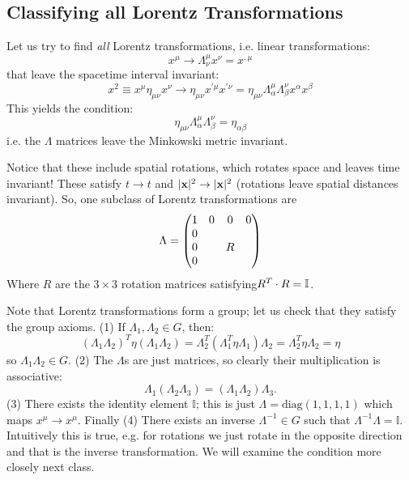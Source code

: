 \subsection{Classifying all Lorentz Transformations}
Let us try to find \emph{all} Lorentz transformations, i.e. linear transformations:
\begin{equation}
    x^\mu \to \Lambda^{\mu}_\nu x^\nu = x^{,\mu}
\end{equation}
that leave the spacetime interval invariant:
\begin{equation}
    x^2 \equiv x^\mu \eta_{\mu\nu} x^\nu \to \eta_{\mu\nu}x^{'\mu}x^{'\nu} = \eta_{\mu\nu}\Lambda^\mu_\alpha \Lambda^\nu_\beta x^\alpha x^\beta
\end{equation}
This yields the condition:
\begin{equation}
    \eta_{\mu\nu} \Lambda^\mu_\alpha \Lambda^\nu_\beta = \eta_{\alpha\beta}
\end{equation}
i.e. the $\Lambda$ matrices leave the Minkowski metric invariant.

Notice that these include spatial rotations, which rotates space and leaves time invariant! These satisfy $t \to t$ and $\lvert \mathbf{x} \rvert^2 \to \lvert \mathbf{x} \rvert^2$ (rotations leave spatial distances invariant). So, one subclass of Lorentz transformations are
\begin{equation}
    \Lambda = \begin{pmatrix}1 & 0 & 0 & 0 \\ 0 & & & \\ 0 & & R & \\ 0 & & &\end{pmatrix}
\end{equation}
Where $R$ are the $3 \times 3$ rotation matrices satisfying$R^T \cdot R = \mathbb{I}$.

Note that Lorentz transformations form a group; let us check that they satisfy the group axioms. (1) If $\Lambda_1, \Lambda_2 \in G$, then:
\begin{equation}
    (\Lambda_1 \Lambda_2)^T \eta (\Lambda_1 \Lambda_2) = \Lambda_2^T (\Lambda_1^T \eta \Lambda_1) \Lambda_2 = \Lambda_2^T \eta \Lambda_2 = \eta
\end{equation}
so $\Lambda_1\Lambda_2 \in G$. (2) The $\Lambda$s are just matrices, so clearly their multiplication is associative:
\begin{equation}
    \Lambda_1(\Lambda_2\Lambda_3) = (\Lambda_1\Lambda_2)\Lambda_3.
\end{equation}
(3) There exists the identity element $\mathbb{I}$; this is just $\Lambda = \text{diag}(1, 1, 1, 1)$ which maps $x^\mu \to x^\mu$. Finally (4) There exists an inverse $\Lambda^{-1} \in G$ such that $\Lambda^{-1}\Lambda = \mathbb{I}$. Intuitively this is true, e.g. for rotations we just rotate in the opposite direction and that is the inverse transformation. We will examine the condition more closely next class. 
